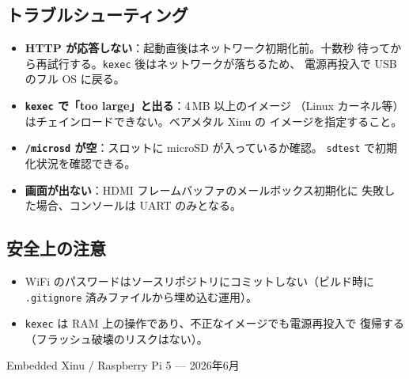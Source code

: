 \documentclass[a4paper,11pt]{ltjsarticle}
\begin{document}
\subsection{トラブルシューティング}
\begin{itemize}[noitemsep]
  \item \textbf{HTTP が応答しない}：起動直後はネットワーク初期化前。十数秒
        待ってから再試行する。\texttt{kexec} 後はネットワークが落ちるため、
        電源再投入で USB のフル OS に戻る。
  \item \textbf{\texttt{kexec} で「too large」と出る}：4\,MB 以上のイメージ
        （Linux カーネル等）はチェインロードできない。ベアメタル Xinu の
        イメージを指定すること。
  \item \textbf{\texttt{/microsd} が空}：スロットに microSD が入っているか確認。
        \texttt{sdtest} で初期化状況を確認できる。
  \item \textbf{画面が出ない}：HDMI フレームバッファのメールボックス初期化に
        失敗した場合、コンソールは UART のみとなる。
\end{itemize}

\subsection{安全上の注意}
\begin{itemize}[noitemsep]
  \item WiFi のパスワードはソースリポジトリにコミットしない（ビルド時に
        \texttt{.gitignore} 済みファイルから埋め込む運用）。
  \item \texttt{kexec} は RAM 上の操作であり、不正なイメージでも電源再投入で
        復帰する（フラッシュ破壊のリスクはない）。
\end{itemize}

\vfill
\begin{center}\small Embedded Xinu / Raspberry Pi 5 — 2026年6月\end{center}
\end{document}

